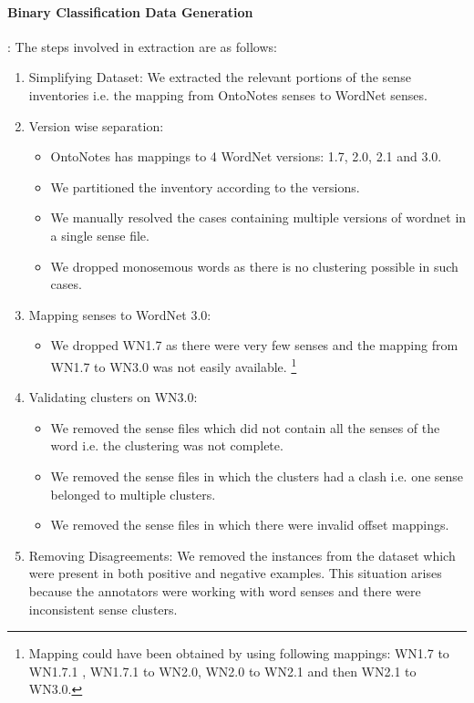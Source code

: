 \paragraph{Binary Classification Data Generation}: The steps involved in extraction are as follows:
\begin{enumerate}
\item Simplifying Dataset: We extracted the relevant portions of the sense inventories i.e. the mapping from OntoNotes senses to WordNet senses.
\item Version wise separation: 
  \begin{itemize}
  \item OntoNotes has mappings to 4 WordNet versions: 1.7, 2.0, 2.1 and 3.0. 
  \item We partitioned the inventory according to the versions. 
  \item We manually resolved the cases containing multiple versions of wordnet in a single sense file.
  \item We dropped monosemous words as there is no clustering possible in such cases.
  \end{itemize}
\item Mapping senses to WordNet 3.0: 
  \begin{itemize}
  \item We dropped WN1.7 as there were very few senses and the mapping from WN1.7 to WN3.0 was not easily available. \footnote{Mapping could have been obtained by using following mappings: WN1.7 to WN1.7.1 , WN1.7.1 to WN2.0, WN2.0 to WN2.1 and then WN2.1 to WN3.0.}
  \end{itemize}
\item Validating clusters on WN3.0: 
  \begin{itemize}
   \item We removed the sense files which did not contain all the senses of the word i.e. the clustering was not complete.
   \item We removed the sense files in which the clusters had a clash i.e. one sense belonged to multiple clusters.
   \item We removed the sense files in which there were invalid offset mappings.
  \end{itemize}
\item Removing Disagreements: We removed the instances from the dataset which were present in both positive and negative examples. This situation arises because the annotators were working with word senses and there were inconsistent sense clusters.
\end{enumerate}


